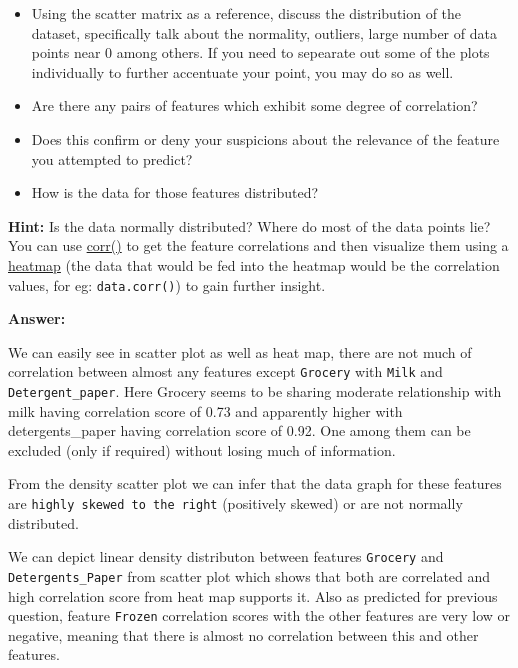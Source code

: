 \documentclass[11pt]{article}
\providecommand{\tightlist}{%
      \setlength{\itemsep}{0pt}\setlength{\parskip}{0pt}}
\begin{document}
\begin{itemize}
\tightlist
\item
  Using the scatter matrix as a reference, discuss the distribution of
  the dataset, specifically talk about the normality, outliers, large
  number of data points near 0 among others. If you need to sepearate
  out some of the plots individually to further accentuate your point,
  you may do so as well.
\item
  Are there any pairs of features which exhibit some degree of
  correlation?
\item
  Does this confirm or deny your suspicions about the relevance of the
  feature you attempted to predict?
\item
  How is the data for those features distributed?
\end{itemize}

\textbf{Hint:} Is the data normally distributed? Where do most of the
data points lie? You can use
\href{https://pandas.pydata.org/pandas-docs/stable/generated/pandas.DataFrame.corr.html}{corr()}
to get the feature correlations and then visualize them using a
\href{http://seaborn.pydata.org/generated/seaborn.heatmap.html}{heatmap}
(the data that would be fed into the heatmap would be the correlation
values, for eg: \texttt{data.corr()}) to gain further insight.

    \textbf{Answer:}

We can easily see in scatter plot as well as heat map, there are not
much of correlation between almost any features except \texttt{Grocery}
with \texttt{Milk} and \texttt{Detergent\_paper}. Here Grocery seems to
be sharing moderate relationship with milk having correlation score of
0.73 and apparently higher with detergents\_paper having correlation
score of 0.92. One among them can be excluded (only if required) without
losing much of information.

From the density scatter plot we can infer that the data graph for these
features are \texttt{highly\ skewed\ to\ the\ right} (positively skewed)
or are not normally distributed.

We can depict linear density distributon between features
\texttt{Grocery} and \texttt{Detergents\_Paper} from scatter plot which
shows that both are correlated and high correlation score from heat map
supports it. Also as predicted for previous question, feature
\texttt{Frozen} correlation scores with the other features are very low
or negative, meaning that there is almost no correlation between this
and other features.
\end{document}
